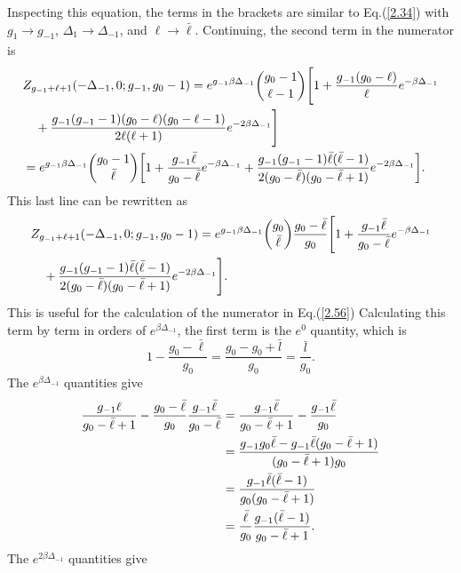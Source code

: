 Inspecting this equation, the terms in the brackets are similar to Eq.\@ (\ref{2.34}) with $g_1\xrightarrow[]{}g_{-1}$, $\Delta_1\xrightarrow[]{}\Delta_{-1}$, and $\ell \xrightarrow[]{}\bar{\ell}$. Continuing, the second term in the numerator is
\begin{align}
    &Z_{g_{-1}+\ell+1}(-\Delta_{-1},0;g_{-1},g_0-1)=e^{g_{-1}\beta\Delta_{-1}}{g_0-1\choose \ell-1}\Biggr[1+\frac{g_{-1}(g_0-\ell)}{\ell}e^{-\beta\Delta_{-1}}\nonumber\\
    &\quad+\frac{g_{-1}(g_{-1}-1)(g_0-\ell)(g_0-\ell-1)}{2\ell(\ell+1)}e^{-2\beta\Delta_{-1}}\Biggr]\nonumber\\
    &=e^{g_{-1}\beta\Delta_{-1}}{g_0-1\choose \Bar{\ell}} \qty[1+\frac{g_{-1}\Bar{\ell}}{g_0-\Bar{\ell}}e^{-\beta\Delta_{-1}}+\frac{g_{-1}(g_{-1}-1)\Bar{\ell}(\Bar{\ell}-1)}{2(g_0-\Bar{\ell})(g_0-\Bar{\ell}+1)}e^{-2\beta\Delta_{-1}}].
\end{align}
This last line can be rewritten as 
\begin{align}
    &Z_{g_{-1}+\ell+1}(-\Delta_{-1},0;g_{-1},g_0-1)=e^{g_{-1}\beta\Delta_{-1}}{g_0\choose \Bar{\ell}} \frac{g_0-\bar{\ell}}{g_0} \Biggr[1+\frac{g_{-1}\Bar{\ell}}{g_0-\Bar{\ell}}e^{-\beta\Delta_{-1}}\nonumber\\
    &\quad+\frac{g_{-1}(g_{-1}-1)\Bar{\ell}(\Bar{\ell}-1)}{2(g_0-\Bar{\ell})(g_0-\Bar{\ell}+1)}e^{-2\beta\Delta_{-1}}\Biggr].
\end{align}
This is useful for the calculation of the numerator in Eq.\@ (\ref{2.56}) Calculating this term by term in orders of $e^{\beta\Delta_{-1}}$, the first term is the $e^0$ quantity, which is 
\begin{equation}
    1-\frac{g_0-\bar{\ell}}{g_0}=\frac{g_0-g_0+\bar{l}}{g_0}=\frac{\bar{l}}{g_0}.
\end{equation}
The $e^{\beta\Delta_{-1}}$ quantities give
\begin{align}
    \frac{g_{-1}\ell}{g_0-\Bar{\ell}+1}-\frac{g_0-\Bar{\ell}}{g_0}\frac{g_{-1}\bar{\ell}}{g_0-\bar{\ell}}&=\frac{g_{-1}\bar{\ell}}{g_0-\bar{\ell}+1}-\frac{g_{-1}\bar{\ell}}{g_0}\nonumber\\
    &=\frac{g_{-1}g_0\bar{\ell}-g_{-1}\bar{\ell}(g_0-\bar{\ell}+1)}{(g_0-\bar{\ell}+1)g_0}\nonumber\\
    &=\frac{g_{-1}\bar{\ell}(\bar{\ell}-1)}{g_0(g_0-\bar{\ell}+1)}\nonumber\\
    &=\frac{\bar{\ell}}{g_0} \frac{g_{-1}(\bar{\ell}-1)}{g_0-\bar{\ell}+1}.
\end{align}
The $e^{2\beta\Delta_{-1}}$ quantities give
